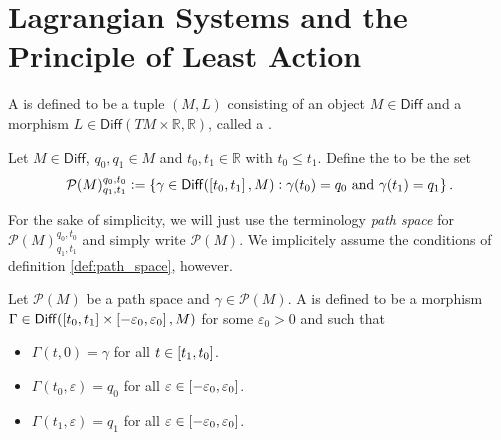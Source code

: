 \section*{Lagrangian Systems and the Principle of Least Action}

\begin{definition}
	A  is defined to be a tuple $(M,L)$ consisting of an object $M \in \mathsf{Diff}$ and a morphism $L \in \mathsf{Diff}(TM \times \mathbb{R},\mathbb{R})$, called a .
\end{definition}

\begin{definition}
	\label{def:path_space}
	Let $M \in \mathsf{Diff}$, $q_0,q_1 \in M$ and $t_0, t_1 \in \mathbb{R}$ with $t_0 \leq t_1$. Define the  to be the set
	\begin{equation}
		\label{eq:path_space}
		\mathcal{P}(M)^{q_0,t_0}_{q_1,t_1} := \cbr[0]{\gamma \in \mathsf{Diff}(\intcc[0]{t_0,t_1},M) : \gamma(t_0) = q_0 \text{ and } \gamma(t_1) = q_1}.
			\end{equation}
\end{definition}

\begin{remark}
	For the sake of simplicity, we will just use the terminology \emph{path space} for $\mathcal{P}(M)^{q_0,t_0}_{q_1,t_1}$ and simply write $\mathcal{P}(M)$. We implicitely assume the conditions of definition \ref{def:path_space}, however.
\end{remark}

\begin{definition}[Variation]
	\label{def:variation}
	Let $\mathcal{P}(M)$ be a path space and $\gamma \in \mathcal{P}(M)$. A  is defined to be a morphism $\Gamma \in \mathsf{Diff}(\intcc[0]{t_0,t_1} \times \intcc[0]{-\varepsilon_0,\varepsilon_0},M)$ for some $\varepsilon_0 > 0$ and such that
	\begin{itemize}[wide=0pt]
		\item $\Gamma(t,0) = \gamma$ for all $t \in \intcc[0]{t_1,t_0}$.
		\item $\Gamma(t_0,\varepsilon) = q_0$ for all $\varepsilon \in \intcc[0]{-\varepsilon_0,\varepsilon_0}$.
		\item $\Gamma(t_1,\varepsilon) = q_1$ for all $\varepsilon \in \intcc[0]{-\varepsilon_0,\varepsilon_0}$.
	\end{itemize}
\end{definition}


